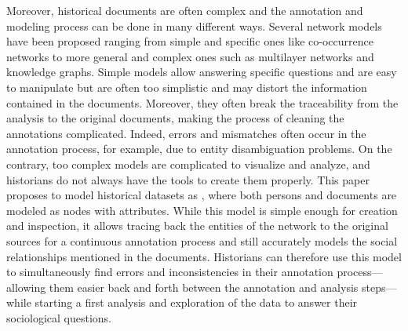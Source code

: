 Moreover, historical documents are often complex and the annotation and modeling process can be done in many different ways.
Several network models have been proposed ranging from simple and specific ones like co-occurrence networks to more general and complex ones such as multilayer networks and knowledge graphs.
Simple models allow answering specific questions and are easy to manipulate but are often too simplistic and may distort the information contained in the documents. Moreover, they often break the traceability from the analysis to the original documents, making the process of cleaning the annotations complicated. Indeed, errors and mismatches often occur in the annotation process, for example, due to entity disambiguation problems.
On the contrary, too complex models are complicated to visualize and analyze, and historians do not always have the tools to create them properly.
This paper proposes to model historical datasets as \modelplural, where both persons and documents are modeled as nodes with attributes.
While this model is simple enough for creation and inspection, it allows tracing back the entities of the network to the original sources for a continuous annotation process and still accurately models the social relationships mentioned in the documents.
Historians can therefore use this model to simultaneously find errors and inconsistencies in their annotation process---allowing them easier back and forth between the annotation and analysis steps---while starting a first analysis and exploration of the data to answer their sociological questions.




